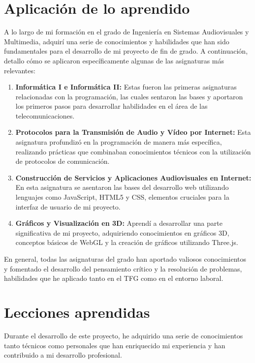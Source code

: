 \documentclass[a4paper, 12pt]{book}
\begin{document}
\section{Aplicación de lo aprendido}
\label{sec:aplicacion}

A lo largo de mi formación en el grado de Ingeniería en Sistemas Audiovisuales y Multimedia, adquirí una serie de conocimientos y 
habilidades que han sido fundamentales para el desarrollo de mi proyecto de fin de grado. A continuación, detallo cómo se aplicaron 
específicamente algunas de las asignaturas más relevantes:

\begin{enumerate}
  \item \textbf{Informática I e Informática II:} Estas fueron las primeras asignaturas relacionadas con la programación, 
  las cuales sentaron las bases y aportaron los primeros pasos para desarrollar habilidades en el área de las telecomunicaciones.
  \item \textbf{Protocolos para la Transmisión de Audio y Vídeo por Internet:} Esta asignatura profundizó en la programación de manera 
  más específica, realizando prácticas que combinaban conocimientos técnicos con la utilización de protocolos de comunicación.
  \item \textbf{Construcción de Servicios y Aplicaciones Audiovisuales en Internet:} En esta asignatura se asentaron las bases del desarrollo 
  web utilizando lenguajes como JavaScript, HTML5 y CSS, elementos cruciales para la interfaz de usuario de mi proyecto.
  \item \textbf{Gráficos y Visualización en 3D:} Aprendí a desarrollar una parte significativa de mi proyecto, adquiriendo conocimientos en 
  gráficos 3D, conceptos básicos de WebGL y la creación de gráficos utilizando Three.js.
\end{enumerate}

En general, todas las asignaturas del grado han aportado valiosos conocimientos y fomentado el desarrollo del pensamiento crítico y la resolución de problemas, habilidades que he aplicado tanto en el TFG como en el entorno laboral.

\section{Lecciones aprendidas}
\label{sec:lecciones_aprendidas}

Durante el desarrollo de este proyecto, he adquirido una serie de conocimientos tanto técnicos como personales que han enriquecido 
mi experiencia y han contribuido a mi desarrollo profesional.
\end{document}
